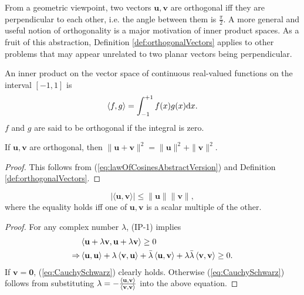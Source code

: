 \begin{rem}
  From a geometric viewpoint,
  two vectors $\mathbf{u}, \mathbf{v}$ are orthogonal iff
  they are perpendicular to each other,
  i.e. the angle between them is $\frac{\pi}{2}$. 
  A more general and useful notion of orthogonality
  is a major motivation of inner product spaces.
  As a fruit of this abstraction,
  Definition \ref{def:orthogonalVectors} applies to other problems
  that may appear unrelated to two planar vectors being perpendicular.
\end{rem}

\begin{exm}
  An inner product on the vector space of 
  continuous real-valued functions on the interval $[-1,1]$ is 
  \begin{equation*}
    \langle f, g \rangle = \int_{-1}^{+1} f(x) g(x)\mathrm{d} x.
  \end{equation*}
  $f$ and $g$ are said to be orthogonal
  if the integral is zero.
\end{exm}

\begin{thm}[Pythagorean]
  \label{thm:Pythagorean}
  If $\mathbf{u}, \mathbf{v}$ are orthogonal,
  then $\|\mathbf{u}+\mathbf{v}\|^2=\|\mathbf{u}\|^2+\|\mathbf{v}\|^2$.
\end{thm}
\begin{proof}
  This follows from (\ref{eq:lawOfCosinesAbstractVersion})
  and Definition \ref{def:orthogonalVectors}.
\end{proof}

\begin{thm}
  \label{thm:SchwarzInequality}
  \begin{equation}
    \label{eq:CauchySchwarz}
    |\langle \mathbf{u},\mathbf{v}\rangle|
    \le \|\mathbf{u}\| \|\mathbf{v}\|,
  \end{equation}
  where the equality holds iff one of $\mathbf{u}, \mathbf{v}$
  is a scalar multiple of the other.
\end{thm}
\begin{proof}
  For any complex number $\lambda$, (IP-1) implies
  \begin{align*}
    & \left\langle \mathbf{u}+\lambda \mathbf{v}, \mathbf{u}+\lambda \mathbf{v} \right\rangle\ge 0
    \\ \Rightarrow
    & 
      \left\langle \mathbf{u}, \mathbf{u} \right\rangle + \lambda\left\langle  \mathbf{v}, \mathbf{u} \right\rangle
      + \bar{\lambda}\left\langle \mathbf{u}, \mathbf{v} \right\rangle+\lambda\bar{\lambda}\left\langle \mathbf{v},\mathbf{v} \right\rangle\ge 0.
  \end{align*}
  If $\mathbf{v}=\mathbf{0}$, (\ref{eq:CauchySchwarz}) clearly holds.
  Otherwise (\ref{eq:CauchySchwarz}) follows from substituting
  \mbox{$\lambda=-\frac{\left\langle \mathbf{u},\mathbf{v} \right\rangle}{\left\langle \mathbf{v},\mathbf{v} \right\rangle}$}
  into the above equation.
\end{proof}

